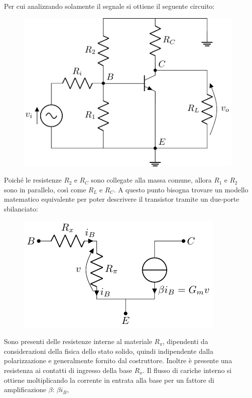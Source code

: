 \documentclass{article}
\numberwithin{equation}{subsection}
\begin{document}
Per cui analizzando solamente il segnale si ottiene il seguente circuito:
\begin{figure}[H]%
    \centering
    \includegraphics{bjt-piccoli-segnali-segnale.pdf}%
    \label{fig:bjt-piccoli-segnali-segnale}
\end{figure}
Poiché le resistenze $R_2$ e $R_C$ sono collegate alla massa comune, allora $R_1$ e $R_2$ sono in parallelo, così come $R_L$ e $R_C$. 
A questo punto bisogna trovare un modello matematico equivalente per poter descrivere il transistor tramite un due-porte sbilanciato:
\begin{figure}[H]%
    \centering
    \includegraphics{bjt-due-porte.pdf}%
    \label{fig:bjt-due-porte}
\end{figure}
Sono presenti delle resistenze interne al materiale $R_{\pi}$, dipendenti da considerazioni della fisica dello stato solido, quindi indipendente 
dalla polarizzazione e generalmente fornito dal costruttore. Inoltre è presente una 
resistenza ai contatti di ingresso della base $R_x$. 
Il flusso di cariche interno si ottiene moltiplicando la corrente in entrata alla base per un fattore di amplificazione $\beta$: $\beta i_B$, 
\end{document}
